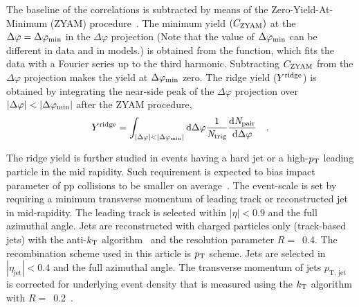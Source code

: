 The baseline of the correlations is subtracted by means of the Zero-Yield-At-Minimum (ZYAM) procedure~\cite{Ajitanand:2005jj}. The minimum yield $(C_{\rm{ZYAM}})$ at the $\Delta\varphi=\Delta\varphi_{\rm{min}}$ in the $\Delta\varphi$ projection (Note that the value of $\Delta\varphi_{\rm{min}}$ can be different in data and in models.) is obtained from the function, which fits the data with a Fourier series up to the third harmonic. Subtracting $C_{\rm{ZYAM}}$ from the $\Delta\varphi$ projection makes the yield at $\Delta\varphi_{\rm{min}}$ zero. The ridge yield ($Y^{\rm{ridge}}$) is obtained by integrating the near-side peak of the $\Delta\varphi$ projection over $|\Delta\varphi|<|\Delta\varphi_{\rm{min}}|$ after the ZYAM procedure,
\begin{eqnarray}
Y^{\rm{ridge}} = \int_{|\Delta \varphi| < |\Delta\varphi_{\rm{min}}| } \rm{d} \Delta\varphi \frac{1}{\it{N}_{\rm{trig}}} \frac{ \rm{d}\it{}N_{\rm{pair}} }{ \rm{d}\Delta\varphi } \quad.
\end{eqnarray}

The ridge yield is further studied in events having a hard jet or a high-$p_\mathrm{T}$ leading particle in the mid rapidity. Such requirement is expected to bias impact parameter of pp collisions to be smaller on average~\cite{Sjostrand:1986ep,Frankfurt:2010ea}.
The event-scale is set by requiring a minimum transverse momentum of leading track or reconstructed jet in mid-rapidity. The leading track is selected within $|\eta|<0.9$ and the full azimuthal angle. Jets are reconstructed with charged particles only (track-based jets) with the anti-$k_{\rm{T}}$ algorithm~\cite{Cacciari2008:FASTJET,Cacciari2012:FASTJET} and the resolution parameter $R=$~0.4. The recombination scheme used in this article is $p_\mathrm{T}$ scheme. Jets are selected in $|\eta_\mathrm{jet}|<0.4$ and the full azimuthal angle. The transverse momentum of jets $p_\mathrm{T,\,jet}$ is corrected for underlying event density that is measured using the $k_{\rm{T}}$ algorithm with $R=$~0.2~\cite{ALICE2019:KTJETSub}. 


